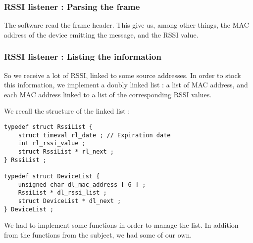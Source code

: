 \subsubsection{RSSI listener : Parsing the frame}

The software read the frame header. This give us, among other things,
the MAC address of the device emitting the message, and the RSSI value.

\subsubsection{RSSI listener : Listing the information}

So we receive a lot of RSSI, linked to some source addresses. In order to stock
this information, we implement a doubly linked list : a list of MAC address,
and each MAC address linked to a list of the corresponding RSSI values.

We recall the structure of the linked list : 

\begin{lstlisting} 
typedef struct RssiList {
	struct timeval rl_date ; // Expiration date
	int rl_rssi_value ;
	struct RssiList * rl_next ;
} RssiList ;

typedef struct DeviceList {
	unsigned char dl_mac_address [ 6 ] ;
	RssiList * dl_rssi_list ;
	struct DeviceList * dl_next ;
} DeviceList ;
\end{lstlisting}

We had to implement some functions in order to manage the list. In addition
from the functions from the subject, we had some of our own.

